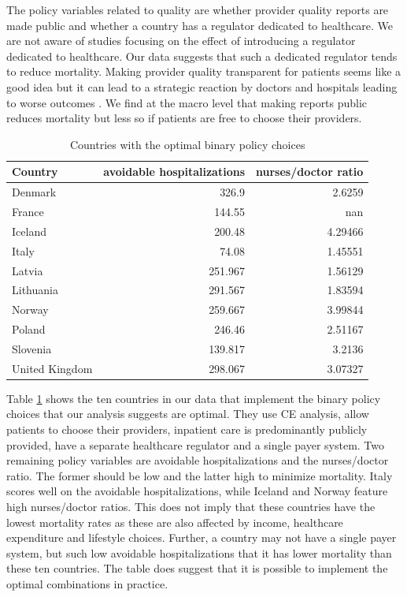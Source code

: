\documentclass[a4paper,12pt]{article}
\begin{document}
The policy variables related to quality are whether provider quality reports are made public and whether a country has a regulator dedicated to healthcare. We are not aware of studies focusing on the effect of introducing a regulator dedicated to healthcare. Our data suggests that such a dedicated regulator tends to reduce mortality. Making provider quality transparent for patients seems like a good idea but it can lead to a strategic reaction by doctors and hospitals leading to worse outcomes \citep{dranoveReportCards2003}. We find at the macro level that making reports public reduces mortality but less so if patients are free to choose their providers.


\begin{table}[htbp]
\caption{\label{tab:countryleague}Countries with the optimal binary policy choices}
\centering
\begin{tabular}{lrr}
Country & avoidable hospitalizations & nurses/doctor ratio\\
\hline
Denmark & 326.9 & 2.6259\\
France & 144.55 & nan\\
Iceland & 200.48 & 4.29466\\
Italy & 74.08 & 1.45551\\
Latvia & 251.967 & 1.56129\\
Lithuania & 291.567 & 1.83594\\
Norway & 259.667 & 3.99844\\
Poland & 246.46 & 2.51167\\
Slovenia & 139.817 & 3.2136\\
United Kingdom & 298.067 & 3.07327\\
\end{tabular}
\end{table}


Table \ref{tab:countryleague} shows the ten countries in our data that implement the binary policy choices that our analysis suggests are optimal. They use CE analysis, allow patients to choose their providers, inpatient care is predominantly publicly provided, have a separate healthcare regulator and a single payer system. Two remaining policy variables are avoidable hospitalizations and the nurses/doctor ratio. The former should be low and the latter high to minimize mortality. Italy scores well on the avoidable hospitalizations, while Iceland and Norway feature high nurses/doctor ratios. This does not imply that these countries have the lowest mortality rates as these are also affected by income, healthcare expenditure and lifestyle choices. Further, a country may not have a single payer system, but such low avoidable hospitalizations that it has lower mortality than these ten countries. The table does suggest that it is possible to implement the optimal combinations in practice.
\end{document}
